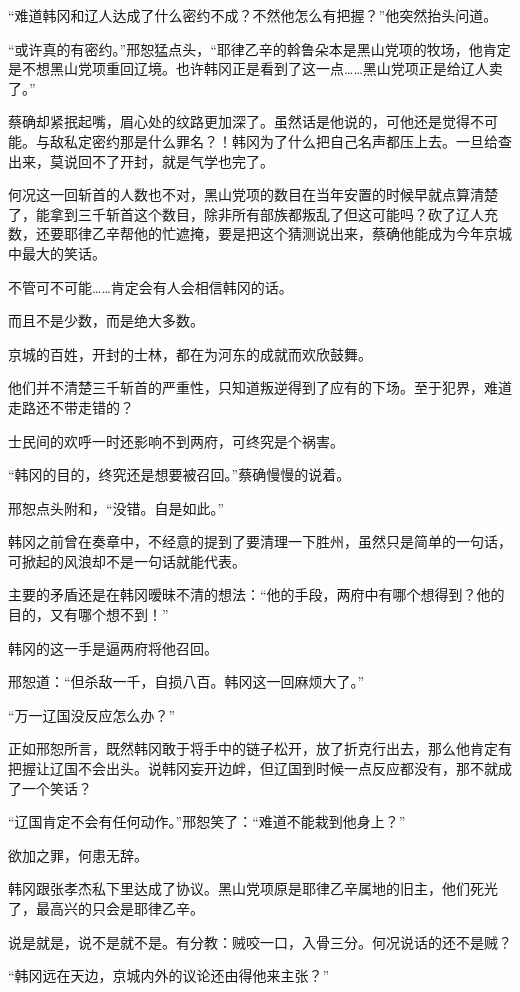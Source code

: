 “难道韩冈和辽人达成了什么密约不成？不然他怎么有把握？”他突然抬头问道。

“或许真的有密约。”邢恕猛点头，“耶律乙辛的斡鲁朵本是黑山党项的牧场，他肯定是不想黑山党项重回辽境。也许韩冈正是看到了这一点……黑山党项正是给辽人卖了。”

蔡确却紧抿起嘴，眉心处的纹路更加深了。虽然话是他说的，可他还是觉得不可能。与敌私定密约那是什么罪名？！韩冈为了什么把自己名声都压上去。一旦给查出来，莫说回不了开封，就是气学也完了。

何况这一回斩首的人数也不对，黑山党项的数目在当年安置的时候早就点算清楚了，能拿到三千斩首这个数目，除非所有部族都叛乱了但这可能吗？砍了辽人充数，还要耶律乙辛帮他的忙遮掩，要是把这个猜测说出来，蔡确他能成为今年京城中最大的笑话。

不管可不可能……肯定会有人会相信韩冈的话。

而且不是少数，而是绝大多数。

京城的百姓，开封的士林，都在为河东的成就而欢欣鼓舞。

他们并不清楚三千斩首的严重性，只知道叛逆得到了应有的下场。至于犯界，难道走路还不带走错的？

士民间的欢呼一时还影响不到两府，可终究是个祸害。

“韩冈的目的，终究还是想要被召回。”蔡确慢慢的说着。

邢恕点头附和，“没错。自是如此。”

韩冈之前曾在奏章中，不经意的提到了要清理一下胜州，虽然只是简单的一句话，可掀起的风浪却不是一句话就能代表。

主要的矛盾还是在韩冈暧昧不清的想法：“他的手段，两府中有哪个想得到？他的目的，又有哪个想不到！”

韩冈的这一手是逼两府将他召回。

邢恕道：“但杀敌一千，自损八百。韩冈这一回麻烦大了。”

“万一辽国没反应怎么办？”

正如邢恕所言，既然韩冈敢于将手中的链子松开，放了折克行出去，那么他肯定有把握让辽国不会出头。说韩冈妄开边衅，但辽国到时候一点反应都没有，那不就成了一个笑话？

“辽国肯定不会有任何动作。”邢恕笑了：“难道不能栽到他身上？”

欲加之罪，何患无辞。

韩冈跟张孝杰私下里达成了协议。黑山党项原是耶律乙辛属地的旧主，他们死光了，最高兴的只会是耶律乙辛。

说是就是，说不是就不是。有分教：贼咬一口，入骨三分。何况说话的还不是贼？

“韩冈远在天边，京城内外的议论还由得他来主张？”

